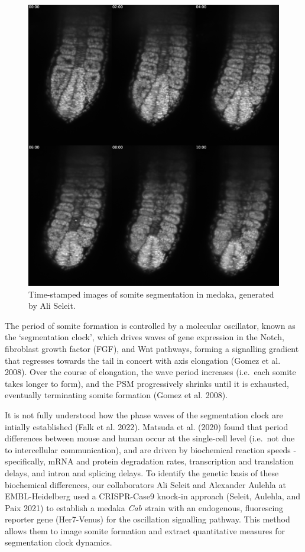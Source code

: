 \documentclass[
]{book}
\begin{document}
\begin{figure}
\includegraphics[width=1\linewidth]{figs/somites/ali_fish_seg_compiled} \caption{Time-stamped images of somite segmentation in medaka, generated by Ali Seleit.}\label{fig:somite-seg-ali}
\end{figure}

The period of somite formation is controlled by a molecular oscillator, known as the `segmentation clock', which drives waves of gene expression in the Notch, fibroblast growth factor (FGF), and Wnt pathways, forming a signalling gradient that regresses towards the tail in concert with axis elongation (Gomez et al. 2008). Over the course of elongation, the wave period increases (i.e.~each somite takes longer to form), and the PSM progressively shrinks until it is exhausted, eventually terminating somite formation (Gomez et al. 2008).

It is not fully understood how the phase waves of the segmentation clock are intially established (Falk et al. 2022). Matsuda et al. (2020) found that period differences between mouse and human occur at the single-cell level (i.e.~not due to intercellular communication), and are driven by biochemical reaction speeds - specifically, mRNA and protein degradation rates, transcription and translation delays, and intron and splicing delays. To identify the genetic basis of these biochemical differences, our collaborators Ali Seleit and Alexander Aulehla at EMBL-Heidelberg used a CRISPR-Case9 knock-in approach (Seleit, Aulehla, and Paix 2021) to establish a medaka \emph{Cab} strain with an endogenous, fluorescing reporter gene (Her7-Venus) for the oscillation signalling pathway. This method allows them to image somite formation and extract quantitative measures for segmentation clock dynamics.
\end{document}

